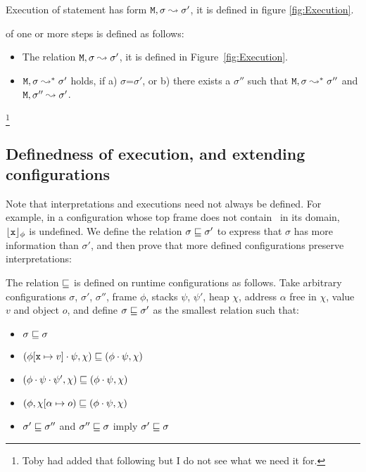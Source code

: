 Execution of statement has   form ${\mbox{\tt{\ensuremath{{\mbox{\tt{M}}}}}}}, \sigma \leadsto \sigma'$, it is defined in figure \ref{fig:Execution}.

\begin{definition}[Execution] of one or more steps is defined as follows:

\begin{itemize}
     \item
   The relation ${\mbox{\tt{\ensuremath{{\mbox{\tt{M}}}}}}}, \sigma \leadsto \sigma'$, it is defined in Figure~\ref{fig:Execution}.

   \item
   ${\mbox{\tt{\ensuremath{{\mbox{\tt{M}}}}}}}, \sigma \leadsto^* \sigma'$ holds, if a) $\sigma$=$\sigma'$, or b) there exists a $\sigma''$ such that
   ${\mbox{\tt{\ensuremath{{\mbox{\tt{M}}}}}}}, \sigma \leadsto^* \sigma''$ and ${\mbox{\tt{\ensuremath{{\mbox{\tt{M}}}}}}}, \sigma'' \leadsto \sigma'$.
 \end{itemize}

\end{definition}

\footnote{Toby had added that following but I do not see what we need it for. }

\subsection{Definedness of execution, and extending configurations}

Note that interpretations and executions need not always be defined.
For example, in a configuration whose top frame does not contain \x\,  in its domain, ${\lfloor{ {{\mbox{\tt{x}}}}}\rfloor_{\phi}} $ is undefined. We define the relation $\sigma \sqsubseteq \sigma'$ to express that   $\sigma$ has more information than $\sigma'$, and then prove that more defined configurations preserve interpretations:

\begin{definition}
The relation $\sqsubseteq$   is defined on runtime configurations as follows. Take arbitrary
configurations $\sigma$, $\sigma'$, $\sigma''$, frame $\phi$, stacks $\psi$, $\psi'$,  heap $\chi$, address $\alpha$ free in $\chi$, value $v$ and object $o$, and define $\sigma  \sqsubseteq \sigma'$ as the smallest relation such that:

\begin{itemize}
\item
$\sigma  \sqsubseteq \sigma$
\item
$(\phi[{\mbox{\tt{x}}} \mapsto v]\cdot \psi, \chi) \sqsubseteq  (\phi\cdot \psi, \chi)$
\item
$(\phi\cdot\psi\cdot\psi', \chi) \sqsubseteq  (\phi\cdot \psi, \chi)$
\item
$(\phi, \chi[\alpha \mapsto o) \sqsubseteq  (\phi\cdot \psi, \chi)$
\item
$\sigma'  \sqsubseteq \sigma''$ and $\sigma''  \sqsubseteq \sigma$ imply $\sigma'  \sqsubseteq \sigma$
\end{itemize}
\end{definition}



